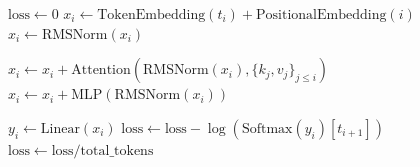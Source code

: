 \begin{algorithm}[H]
\caption{High-Level Forward Pass}
\label{alg:forward-pass}
\begin{algorithmic}
\State $\text{loss} \gets 0$
        \State $x_i \gets \text{TokenEmbedding}(t_i) + \text{PositionalEmbedding}(i)$
        \State $x_i \gets \text{RMSNorm}(x_i)$

            \State $x_i \gets x_i + \text{Attention}(\text{RMSNorm}(x_i), \{k_j, v_j\}_{j \le i})$
            \State $x_i \gets x_i + \text{MLP}(\text{RMSNorm}(x_i))$
        \EndFor

        \State $y_i \gets \text{Linear}(x_i)$
        \State $\text{loss} \gets \text{loss} - \log(\text{Softmax}(y_i)[t_{i+1}])$
    \EndFor
\EndFor
\State $\text{loss} \gets \text{loss} / \text{total\_tokens}$
\end{algorithmic}
\end{algorithm}
